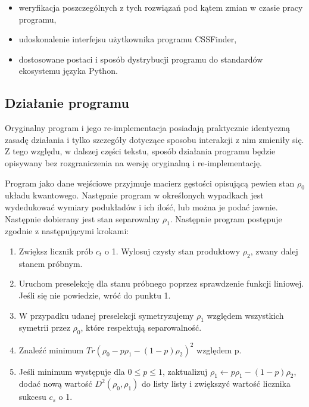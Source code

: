\documentclass[11pt, a4paper]{article}
\begin{document}
\begin{sloppypar}
\begin{itemize}
      \item weryfikacja poszczególnych z tych rozwiązań pod kątem zmian w czasie pracy programu,

      \item udoskonalenie interfejsu użytkownika programu CSSFinder,

      \item dostosowane postaci i sposób dystrybucji programu do standardów ekosystemu języka
        Python.
    \end{itemize}


    \subsection{Działanie programu}


    Oryginalny program i jego re-implementacja posiadają praktycznie identyczną zasadę
    działania i tylko szczegóły dotyczące sposobu interakcji z nim zmieniły się. Z tego względu,
    w dalszej części tekstu, sposób działania programu będzie opisywany bez rozgraniczenia
    na wersję oryginalną i re-implementację.

    Program jako dane wejściowe przyjmuje macierz gęstości opisującą pewien stan $\rho_{0}$
    układu kwantowego. Następnie program w określonych wypadkach jest wydedukować
    wymiary podukładów i ich ilość, lub można je podać jawnie. Następnie dobierany jest
    stan separowalny $\rho_{1}$. Następnie program postępuje zgodnie z następującymi krokami:

    \begin{enumerate}
      \item Zwiększ licznik prób $c_{t}$ o 1. Wylosuj czysty stan produktowy $\rho_{2}$,
        zwany dalej stanem próbnym.

      \item Uruchom preselekcję dla stanu próbnego poprzez sprawdzenie funkcji liniowej.
        Jeśli się nie powiedzie, wróć do punktu 1.

      \item W przypadku udanej preselekcji symetryzujemy $\rho_{1}$ względem wszystkich symetrii
        przez $\rho_{0}$, które respektują separowalność.

      \item Znaleźć minimum $Tr(\rho_{0}- p\rho_{1}- (1 - p)\rho_{2})^{2}$ względem p.

      \item Jeśli minimum występuje dla $0 \le p \le 1$, zaktualizuj
        $\rho_{1}\leftarrow p\rho_{1}- (1 - p)\rho_{2}$, dodać nową wartość $D^{2}(\rho_{0}
        , \rho_{1})$ do listy listy i zwiększyć wartość licznika sukcesu $c_{s}$ o 1.


\end{enumerate}
\end{sloppypar}
\end{document}
